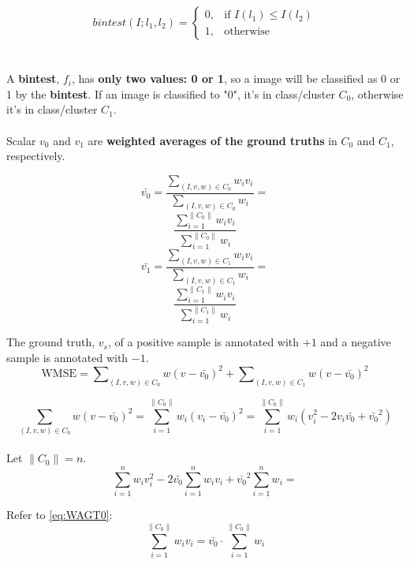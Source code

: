 \documentclass[11pt]{article}
\begin{document}
\begin{equation}
\label{eq:bintest}
    bintest(I;l_1,l_2)= 
\begin{cases}
    0,		& \text{if } I(l_1)\leq I(l_2)\\
    1,      & \text{otherwise}
\end{cases}
\end{equation}\\
\\ A \textbf{bintest}, $f_i$, has \textbf{only two values: 0 or 1}, so a image will be classified as 0 or 1 by the \textbf{bintest}. If an image is classified to "0", it's in class/cluster $C_0$, otherwise it's in class/cluster $C_1$. \\
\\ Scalar $v_0$ and $v_1$ are \textbf{weighted averages of the ground truths} in $C_0$ and $C_1$, respectively.

\begin{equation}
\label{eq:WAGT0}
\bar{v_0}=\frac{\sum\nolimits_{(I,v,w) \in C_0} w_i v_i} { \sum\nolimits_{(I,v,w) \in C_0} w_i} =
\end{equation}
\[
\frac{\sum_{i=1}^{\| C_0 \|}  w_i v_i}
{\sum_{i=1}^{\| C_0 \|}  w_i}
\]
\begin{equation}
\label{eq:WAGT1}
\bar{v_1}=\frac{\sum\nolimits_{(I,v,w) \in C_1} w_i v_i} { \sum\nolimits_{(I,v,w) \in C_1} w_i}=
\end{equation}
\[
\frac{\sum_{i=1}^{\| C_1 \|}  w_i v_i}
{\sum_{i=1}^{\| C_1 \|}  w_i}
\]

The ground truth, $v_s$, of a positive sample is annotated with $+1$ and 
a negative sample is annotated with $-1$.\\


\begin{equation}
\label{eq:WMSE}
\text{WMSE}=
\sum\nolimits_{(I,v,w) \in C_0} w (v-\bar{v_0})^2 + 
\sum\nolimits_{(I,v,w) \in C_1} w (v-\bar{v_0})^2
\end{equation}

\[\sum_{(I,v,w) \in C_0} w (v-\bar{v_0})^2=\sum_{i=1}^{\| C_0 \|} w_i (v_i - \bar{v_0})^2=
\sum_{i=1}^{\| C_0 \|} w_i (v_i^2 - 2v_i \bar{v_0} + \bar{v_0}^2)\]\\

Let $\| C_{0} \|=n$.\\

\[\sum_{i=1}^{n} w_i v_i^2 - 2\bar{v_0}\sum_{i=1}^{n} w_i v_i + 
\bar{v_0}^2\sum_{i=1}^{n} w_i=\]

Refer to \eqref{eq:WAGT0}:
\[
\sum_{i=1}^{\| C_0 \|}  w_i v_i = \bar{v_0} \cdot \sum_{i=1}^{\| C_0 \|}  w_i
\]
\end{document}
